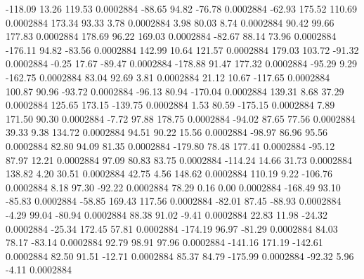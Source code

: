      -118.09       13.26      119.53     0.0002884
      -88.65       94.82      -76.78     0.0002884
      -62.93      175.52      110.69     0.0002884
      173.34       93.33        3.78     0.0002884
        3.98       80.03        8.74     0.0002884
       90.42       99.66      177.83     0.0002884
      178.69       96.22      169.03     0.0002884
      -82.67       88.14       73.96     0.0002884
     -176.11       94.82      -83.56     0.0002884
      142.99       10.64      121.57     0.0002884
      179.03      103.72      -91.32     0.0002884
       -0.25       17.67      -89.47     0.0002884
     -178.88       91.47      177.32     0.0002884
      -95.29        9.29     -162.75     0.0002884
       83.04       92.69        3.81     0.0002884
       21.12       10.67     -117.65     0.0002884
      100.87       90.96      -93.72     0.0002884
      -96.13       80.94     -170.04     0.0002884
      139.31        8.68       37.29     0.0002884
      125.65      173.15     -139.75     0.0002884
        1.53       80.59     -175.15     0.0002884
        7.89      171.50       90.30     0.0002884
       -7.72       97.88      178.75     0.0002884
      -94.02       87.65       77.56     0.0002884
       39.33        9.38      134.72     0.0002884
       94.51       90.22       15.56     0.0002884
      -98.97       86.96       95.56     0.0002884
       82.80       94.09       81.35     0.0002884
     -179.80       78.48      177.41     0.0002884
      -95.12       87.97       12.21     0.0002884
       97.09       80.83       83.75     0.0002884
     -114.24       14.66       31.73     0.0002884
      138.82        4.20       30.51     0.0002884
       42.75        4.56      148.62     0.0002884
      110.19        9.22     -106.76     0.0002884
        8.18       97.30      -92.22     0.0002884
       78.29        0.16        0.00     0.0002884
     -168.49       93.10      -85.83     0.0002884
      -58.85      169.43      117.56     0.0002884
      -82.01       87.45      -88.93     0.0002884
       -4.29       99.04      -80.94     0.0002884
       88.38       91.02       -9.41     0.0002884
       22.83       11.98      -24.32     0.0002884
      -25.34      172.45       57.81     0.0002884
     -174.19       96.97      -81.29     0.0002884
       84.03       78.17      -83.14     0.0002884
       92.79       98.91       97.96     0.0002884
     -141.16      171.19     -142.61     0.0002884
       82.50       91.51      -12.71     0.0002884
       85.37       84.79     -175.99     0.0002884
      -92.32        5.96       -4.11     0.0002884
